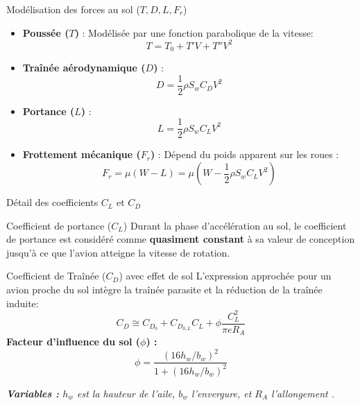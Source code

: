 	\begin{frame}{Modélisation des forces au sol ($T, D, L, F_r$)}
		
		
		\begin{itemize}
			\item \textbf{Poussée ($T$)} : Modélisée par une fonction parabolique de la vitesse:
			\[ T = T_0 + T'V + T''V^2 \]
			\item \textbf{Traînée aérodynamique ($D$)} :
			\[ D = \frac{1}{2} \rho S_w C_D V^2 \]
			\item \textbf{Portance ($L$)} :
			\[ L = \frac{1}{2} \rho S_w C_L V^2 \]
			\item \textbf{Frottement mécanique ($F_r$)} : Dépend du poids apparent sur les roues :
			\[ F_r = \mu (W - L) = \mu \left( W - \frac{1}{2} \rho S_w C_L V^2 \right) \]
		\end{itemize}
	\end{frame}
	
	
	\begin{frame}{Détail des coefficients $C_L$ et $C_D$}
		\begin{block}{Coefficient de portance ($C_L$)}
			Durant la phase d'accélération au sol, le coefficient de portance est considéré comme \textbf{quasiment constant} à sa valeur de conception jusqu'à ce que l'avion atteigne la vitesse de rotation.
		\end{block}
		
		\begin{block}{Coefficient de Traînée ($C_D$) avec effet de sol}
			L'expression approchée pour un avion proche du sol intègre la traînée parasite et la réduction de la traînée induite:
			\[ C_D \cong C_{D_0} + C_{D_{0,L}} C_L + \phi \frac{C_L^2}{\pi e R_A} \]
			\textbf{Facteur d'influence du sol ($\phi$) :}
			\[ \phi = \frac{(16 h_w / b_w)^2}{1 + (16 h_w / b_w)^2} \]
		\end{block}
		
		\textit{\small \textbf{Variables :} $h_w$ est la hauteur de l'aile, $b_w$ l'envergure, et $R_A$ l'allongement .}
	\end{frame}
	
	
	


